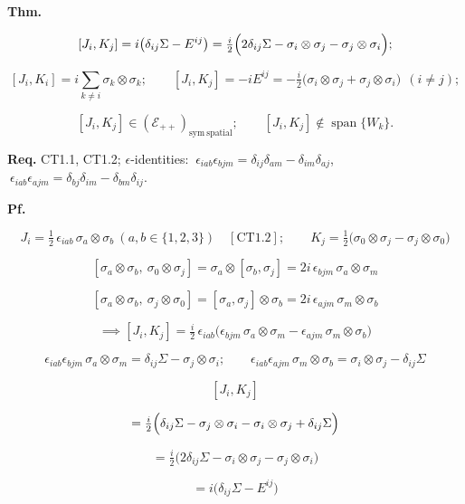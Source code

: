\begin{theorem}\label{tag:CT1-7}
\textbf{Thm.}

\[
[J_i,K_j]=i\bigl(\delta_{ij}\Sigma-E^{ij}\bigr)=\tfrac i2\Bigl(2\delta_{ij}\Sigma-\sigma_i\otimes\sigma_j-\sigma_j\otimes\sigma_i\Bigr);
\]

\[
[J_i,K_i]=i\!\!\sum_{k\ne i}\!\!\sigma_k\otimes\sigma_k;\qquad
[J_i,K_j]=-iE^{ij}=-\tfrac i2\bigl(\sigma_i\otimes\sigma_j+\sigma_j\otimes\sigma_i\bigr)\ \ (i\ne j);
\]

\[
[J_i,K_j]\in(\mathcal E_{++})_{\mathrm{sym\ spatial}};\qquad [J_i,K_j]\notin\operatorname{span}\{W_k\}.
\]

\textbf{Req.} CT1.1, CT1.2; $\epsilon$-identities: $\ \epsilon_{iab}\epsilon_{bjm}=\delta_{ij}\delta_{am}-\delta_{im}\delta_{aj}$, $\ \epsilon_{iab}\epsilon_{ajm}=\delta_{bj}\delta_{im}-\delta_{bm}\delta_{ij}$.

\textbf{Pf.}

\[
J_i=\tfrac12\,\epsilon_{iab}\,\sigma_a\otimes\sigma_b\ (a,b\in\{1,2,3\})\quad[\mathrm{CT1.2}];\qquad
K_j=\tfrac12\bigl(\sigma_0\otimes\sigma_j-\sigma_j\otimes\sigma_0\bigr)
\]

\[
[\sigma_a\otimes\sigma_b,\ \sigma_0\otimes\sigma_j]=\sigma_a\otimes[\sigma_b,\sigma_j]=2i\,\epsilon_{bjm}\,\sigma_a\otimes\sigma_m
\]

\[
[\sigma_a\otimes\sigma_b,\ \sigma_j\otimes\sigma_0]=[\sigma_a,\sigma_j]\otimes\sigma_b=2i\,\epsilon_{ajm}\,\sigma_m\otimes\sigma_b
\]

\[
\implies[J_i,K_j]=\tfrac i2\,\epsilon_{iab}\bigl(\epsilon_{bjm}\,\sigma_a\otimes\sigma_m-\epsilon_{ajm}\,\sigma_m\otimes\sigma_b\bigr)
\]

\[
\epsilon_{iab}\epsilon_{bjm}\,\sigma_a\otimes\sigma_m=\delta_{ij}\Sigma-\sigma_j\otimes\sigma_i;\qquad
\epsilon_{iab}\epsilon_{ajm}\,\sigma_m\otimes\sigma_b=\sigma_i\otimes\sigma_j-\delta_{ij}\Sigma
\]

\[
[J_i,K_j]
\]

\[
= \tfrac i2\Bigl(\delta_{ij}\Sigma-\sigma_j\otimes\sigma_i-\sigma_i\otimes\sigma_j+\delta_{ij}\Sigma\Bigr)
\]

\[
= \tfrac i2\bigl(2\delta_{ij}\Sigma-\sigma_i\otimes\sigma_j-\sigma_j\otimes\sigma_i\bigr)
\]

\[
= i\bigl(\delta_{ij}\Sigma-E^{ij}\bigr)
\]


\end{theorem}
